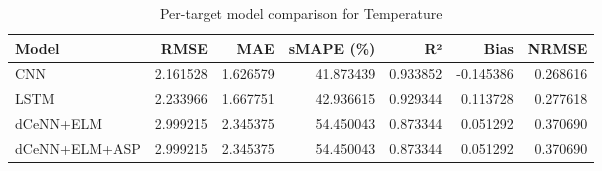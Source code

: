 \begin{table}
\caption{Per-target model comparison for Temperature}
\begin{tabular}{lrrrrrr}
\toprule
Model & RMSE & MAE & sMAPE (\%) & R² & Bias & NRMSE \\
\midrule
CNN & 2.161528 & 1.626579 & 41.873439 & 0.933852 & -0.145386 & 0.268616 \\
LSTM & 2.233966 & 1.667751 & 42.936615 & 0.929344 & 0.113728 & 0.277618 \\
dCeNN+ELM & 2.999215 & 2.345375 & 54.450043 & 0.873344 & 0.051292 & 0.370690 \\
dCeNN+ELM+ASP & 2.999215 & 2.345375 & 54.450043 & 0.873344 & 0.051292 & 0.370690 \\
\bottomrule
\end{tabular}
\end{table}
